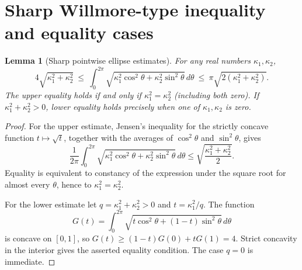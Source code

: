 \documentclass[10pt,a4paper]{article}
\newtheorem{lemma}[theorem]{Lemma}
\theoremstyle{remark}\newtheorem{remark}[theorem]{Remark}
\begin{document}
\section{Sharp Willmore-type inequality and equality cases}
\begin{lemma}[Sharp pointwise ellipse estimates]\label{lem:perim}
For any real numbers $\kappa_1,\kappa_2$,
\begin{equation}\label{eq:ellbounds}
4\sqrt{\kappa_1^2+\kappa_2^2}\ \leq\
\int_0^{2\pi}\sqrt{\kappa_1^2\cos^2\theta+\kappa_2^2\sin^2\theta}\,d\theta
\ \leq\ \pi\sqrt{2(\kappa_1^2+\kappa_2^2)}.
\end{equation}
The upper equality holds if and only if $\kappa_1^2=\kappa_2^2$ (including both zero). If $\kappa_1^2+\kappa_2^2>0$, lower equality holds precisely when one of $\kappa_1,\kappa_2$ is zero.
\end{lemma}
\begin{proof}
For the upper estimate, Jensen's inequality for the strictly concave function $t\mapsto\sqrt t$, together with the averages of $\cos^2\theta$ and $\sin^2\theta$, gives
\[
\frac1{2\pi}\int_0^{2\pi}\sqrt{\kappa_1^2\cos^2\theta+\kappa_2^2\sin^2\theta}\,d\theta
\leq\sqrt{\frac{\kappa_1^2+\kappa_2^2}{2}}.
\]
Equality is equivalent to constancy of the expression under the square root for almost every $\theta$, hence to $\kappa_1^2=\kappa_2^2$.

For the lower estimate let $q=\kappa_1^2+\kappa_2^2>0$ and $t=\kappa_1^2/q$. The function
\[
G(t)=\int_0^{2\pi}\sqrt{t\cos^2\theta+(1-t)\sin^2\theta}\,d\theta
\]
is concave on $[0,1]$, so $G(t)\geq (1-t)G(0)+tG(1)=4$. Strict concavity in the interior gives the asserted equality condition. The case $q=0$ is immediate.
\end{proof}
\end{document}
